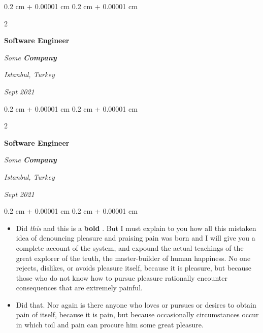 \documentclass[10pt, letterpaper]{article}
\newenvironment{highlights}{
    \begin{itemize}[
        topsep=0.10 cm,
        parsep=0.10 cm,
        partopsep=0pt,
        itemsep=0pt,
        leftmargin=0.4 cm + 10pt
    ]
}{
    \end{itemize}
} %
\newenvironment{onecolentry}{
    \begin{adjustwidth}{
        0.2 cm + 0.00001 cm
    }{
        0.2 cm + 0.00001 cm
    }
}{
    \end{adjustwidth}
} %
\newenvironment{twocolentry}[2][]{
    \onecolentry
    \def\secondColumn{#2}
    \setcolumnwidth{\fill, 4.5 cm}
    \begin{paracol}{2}
}{
    \switchcolumn \raggedleft \secondColumn
    \end{paracol}
    \endonecolentry
} %
\let\hrefWithoutArrow\href
\renewcommand{\href}[2]{\hrefWithoutArrow{#1}{\ifthenelse{\equal{#2}{}}{ }{#2 }\raisebox{.15ex}{\footnotesize \faExternalLink*}}}
\begin{document}
        \vspace{0.2 cm}

            \begin{twocolentry}{
        \textit{Istanbul, Turkey}

        \textit{Sept 2021}    }
                \textbf{Software Engineer}

                \textit{Some \textbf{Company}}
            \end{twocolentry}



        \vspace{0.2 cm}

            \begin{twocolentry}{
        \textit{Istanbul, Turkey}

        \textit{Sept 2021}    }
                \textbf{Software Engineer}

                \textit{Some \textbf{Company}}
            \end{twocolentry}

        \vspace{0.10 cm}
        \begin{onecolentry}
            \begin{highlights}
                \item Did \textit{this} and this is a \textbf{bold} \href{https://example.com}{link}. But I must explain to you how all this mistaken idea of denouncing pleasure and praising pain was born and I will give you a complete account of the system, and expound the actual teachings of the great explorer of the truth, the master-builder of human happiness. No one rejects, dislikes, or avoids pleasure itself, because it is pleasure, but because those who do not know how to pursue pleasure rationally encounter consequences that are extremely painful.
                \item Did that. Nor again is there anyone who loves or pursues or desires to obtain pain of itself, because it is pain, but because occasionally circumstances occur in which toil and pain can procure him some great pleasure.
            \end{highlights}
        \end{onecolentry}
\end{document}
